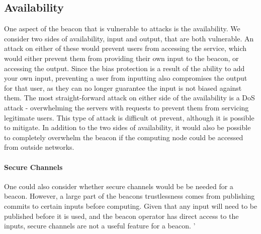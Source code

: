 \subsection{Availability}
One aspect of the beacon that is vulnerable to attacks is the availability. We consider two sides of availability, input and output, that are both vulnerable. An attack on either of these would prevent users from accessing the service, which would either prevent them from providing their own input to the beacon, or accessing the output. Since the bias protection is a result of the ability to add your own input, preventing a user from inputting also compromises the output for that user, as they can no longer guarantee the input is not biased against them. 
The most straight-forward attack on either side of the availability is a DoS attack - overwhelming the servers with requests to prevent them from servicing legitimate users. This type of attack is difficult ot prevent, although it is possible to mitigate. %
In addition to the two sides of availability, it would also be possible to completely overwhelm the beacon if the computing node could be accessed from outside networks. 

\paragraph{Secure Channels}
One could also consider whether secure channels would be be needed for a beacon. However, a large part of the beacons trustlessness comes from publishing commits to certain inputs before computing. Given that any input will need to be published before it is used, and the beacon operator has direct access to the inputs, secure channels are not a useful feature for a beacon. '